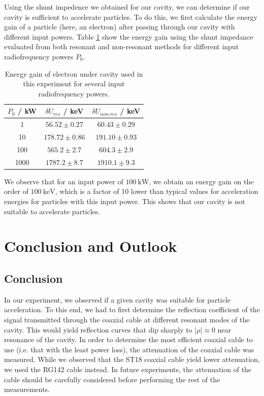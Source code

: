 \documentclass[a4paper]{report}
\numberwithin{equation}{section}
\begin{document}
Using the shunt impedence we obtained for our cavity, we can determine if our cavity is sufficient to accelerate particles. To do this,
we first calculate the energy gain of a particle (here, an electron) after passing through our cavity with different input powers.
Table \ref{tab:energy_gain} show the energy gain using the shunt impedance evaluated from both resonant and non-resonant methods for 
different input radiofrequency powers $P_0$.

\begin{table}[h!]
	\centering
	\begin{tabular}{|c|c|c|}
		\hline $P_0$ / kW & $\delta U_{res}$ / keV & $\delta U_{non\text{-}res}$ / keV \\
		\hline 1 & $56.52 \pm 0.27$ & $60.43 \pm 0.29$ \\ 
		\hline 10 & $178.72 \pm 0.86$ & $191.10 \pm 0.93$ \\ 
		\hline 100 & $565.2 \pm 2.7$ & $604.3 \pm 2.9$ \\ 
		\hline 1000 & $1787.2 \pm 8.7$ & $1910.1 \pm 9.3$ \\ 
		\hline
	\end{tabular}
	\caption{Energy gain of electron under cavity used in this experiment for several input radiofrequency powers.}
	\label{tab:energy_gain}
\end{table}

We observe that for an input power of $\SI{100}{\kilo\watt}$, we obtain an energy gain on the order of $\SI{100}{\kilo\electronvolt}$, 
which is a factor of 10 lower than typical values for acceleration energies for particles with this input power. This 
shows that our cavity is not suitable to accelerate particles. \par 

\chapter{Conclusion and Outlook}

\section{Conclusion}

In our experiment, we observed if a given cavity was suitable for particle acceleration. To this end, we had to first determine
the reflection coefficient of the signal transmitted through the coaxial cable at different resonant modes of the cavity. This
would yield reflection curves that dip sharply to $|\rho| \approx 0$ near resonance of the cavity. In order to determine the 
most efficient coaxial cable to use (i.e. that with the least power loss), the attenuation of the coaxial cable was measured. 
While we observed that the ST18 coaxial cable yield lower attenuation, we used the RG142 cable instead. In future experiments,
the attenuation of the cable should be carefully considered before performing the rest of the measurements. \par 
\end{document}
